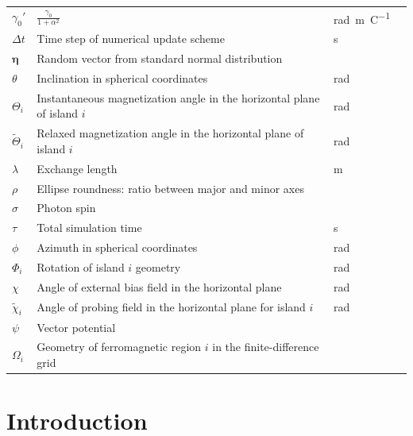 \documentclass[11pt,a4paper,english]{article}
\renewcommand{\vec}[1]{\boldsymbol{#1}}
\begin{document}
\begin{longtable}{llll}
$\gamma_0'$ & $\frac{\gamma_0}{1+\alpha^2}$ & \si{\radian\metre\per\coulomb} \\
$\Delta t$ & Time step of numerical update scheme & \si{\second} \\
$\vec{\eta}$ & Random vector from standard normal distribution &  \\
$\theta$ & Inclination in spherical coordinates & \si{\radian} \\
$\Theta_i$ & Instantaneous magnetization angle in the horizontal plane of island $i$ & \si{\radian} \\
$\widetilde{\Theta}_i$ & Relaxed magnetization angle in the horizontal plane of island $i$ & \si{\radian} \\
$\lambda$ & Exchange length & \si{\metre} \\
$\rho$ & Ellipse roundness: ratio between major and minor axes &  \\
$\sigma$ & Photon spin & \si{} \\
$\tau$ & Total simulation time & \si{\second} \\
$\phi$ & Azimuth in spherical coordinates & \si{\radian} \\
$\Phi_i$ & Rotation of island $i$ geometry & \si{\radian} \\
$\chi$ & Angle of external bias field in the horizontal plane & \si{\radian} \\
$\widetilde{\chi}_i$ & Angle of probing field in the horizontal plane for island $i$ & \si{\radian} \\
$\psi$ & Vector potential & \\
$\Omega_i$ & Geometry of ferromagnetic region $i$ in the finite-difference grid & \\
\bottomrule
\end{longtable}



\cleardoublepage
{}
\section{Introduction}
\end{document}
